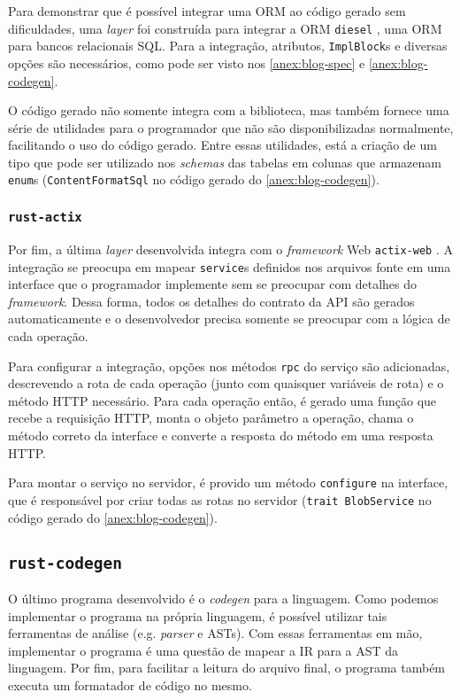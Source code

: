 Para demonstrar que é possível integrar uma ORM ao código gerado sem dificuldades, uma
\textit{layer} foi construída para integrar a ORM \texttt{diesel} \cite{rust:diesel},
uma ORM para bancos relacionais SQL. Para a integração, atributos, \texttt{ImplBlock}s
e diversas opções são necessários, como pode ser visto nos \cref{anex:blog-spec} e
\cref{anex:blog-codegen}.

O código gerado não somente integra com a biblioteca, mas também fornece uma série de
utilidades para o programador que não são disponibilizadas normalmente, facilitando o
uso do código gerado. Entre essas utilidades, está a criação de um tipo que pode ser
utilizado nos \textit{schemas} das tabelas em colunas que armazenam \texttt{enum}s
(\texttt{ContentFormatSql} no código gerado do \cref{anex:blog-codegen}).

\subsubsection{\texttt{rust-actix}}

Por fim, a última \textit{layer} desenvolvida integra com o \textit{framework} Web
\texttt{actix-web} \cite{rust:actix-web}. A integração se preocupa em mapear
\texttt{service}s definidos nos arquivos fonte em uma interface que o programador
implemente sem se preocupar com detalhes do \textit{framework}. Dessa forma, todos
os detalhes do contrato da API são gerados automaticamente e o desenvolvedor precisa
somente se preocupar com a lógica de cada operação.

Para configurar a integração, opções nos métodos \texttt{rpc} do serviço são adicionadas,
descrevendo a rota de cada operação (junto com quaisquer variáveis de rota) e o método
HTTP necessário. Para cada operação então, é gerado uma função que recebe a requisição
HTTP, monta o objeto parâmetro a operação, chama o método correto da interface e converte
a resposta do método em uma resposta HTTP.

Para montar o serviço no servidor, é provido um método \texttt{configure} na interface,
que é responsável por criar todas as rotas no servidor (\texttt{trait BlobService} no
código gerado do \cref{anex:blog-codegen}).

\subsection{\texttt{rust-codegen}}

O último programa desenvolvido é o \textit{codegen} para a linguagem. Como podemos
implementar o programa na própria linguagem, é possível utilizar tais ferramentas de
análise (e.g. \textit{parser} e ASTs). Com essas ferramentas em mão, implementar o programa
é uma questão de mapear a IR para a AST da linguagem. Por fim, para facilitar a leitura
do arquivo final, o programa também executa um formatador de código no mesmo.
